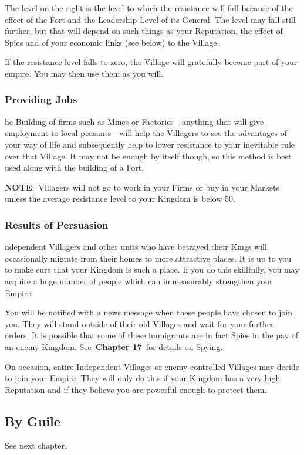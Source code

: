 The level on the right is the level to which the resistance will fall because of the effect of the Fort and the Leadership Level of its General. The level may fall still further, but that will depend on such things as your Reputation, the effect of Spies and of your economic links (see below) to the Village.

If the resistance level falls to zero, the Village will gratefully become part of your empire. You may then use them as you will.

\subsubsection{Providing Jobs}

he Building of firms such as Mines or Factories---anything that will give employment to local peasants---will help the Villagers to see the advantages of your way of life and subsequently help to lower resistance to your inevitable rule over that Village. It may not be enough by itself though, so this method is best used along with the building of a Fort.

\textbf{NOTE}: Villagers will not go to work in your Firms or buy in your Markets unless the average resistance level to your Kingdom is below 50. 

\subsubsection{Results of Persuasion}

ndependent Villagers and other units who have betrayed their Kings will occasionally migrate from their homes to more attractive places. It is up to you to make sure that your Kingdom is such a place. If you do this skillfully, you may acquire a huge number of people which can immeasurably strengthen your Empire.

You will be notified with a news message when these people have chosen to join you. They will stand outside of their old Villages and wait for your further orders. It is possible that some of these immigrants are in fact Spies in the pay of an enemy Kingdom. See \textbf{Chapter 17} for details on Spying.

On occasion, entire Independent Villages or enemy-controlled Villages may decide to join your Empire. They will only do this if your Kingdom has a very high Reputation and if they believe you are powerful enough to protect them.

\subsection{By Guile}

See next chapter.